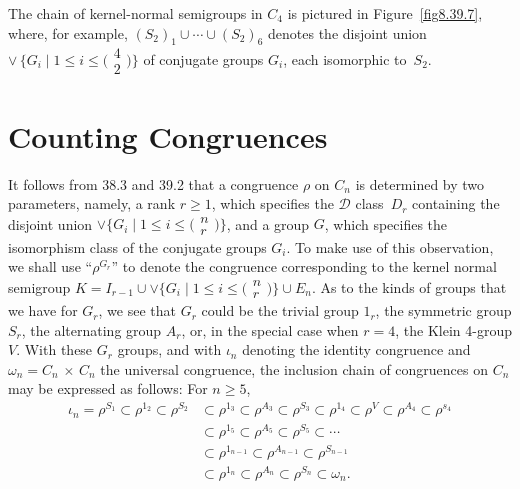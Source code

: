 \documentclass{surv-l}
\numberwithin{equation}{section}
\numberwithin{table}{section}
\numberwithin{figure}{section}
\theoremstyle{definition}
\begin{document}
The chain of kernel-normal semigroups in $C_{4}$ is pictured in
Figure~\ref{fig8.39.7}, where, for example,
$(S_{2})_{1}\cup\cdots\cup(S_{2})_{6}$ denotes the disjoint union
$\vee\,\{G_{i}\mid 1\leq i\leq\big(\!\begin{smallmatrix}
4\\
2 \end{smallmatrix}\!\big)\}$ of conjugate groups $G_{i}$, each
isomorphic to~$S_{2}$.

\section{Counting Congruences}\label{sec8.40}

It follows from 38.3 and 39.2 that a congruence $\rho$ on $C_{n}$
is determined by two parameters, namely, a rank $r\geq 1$, which
specifies the $\mathcal{D}$ class~$D_{r}$ containing the disjoint
union $\vee \{G_{i}\mid 1 \leq i\leq\big(\!\begin{smallmatrix}
n\\
r \end{smallmatrix}\!\big)\}$, and a group $G$, which specifies
the isomorphism class of the conjugate groups $G_{i}$. To make use
of this observation, we shall use ``$\rho^{G_{r}}$'' to denote the
congruence corresponding to the kernel normal semigroup $K=I_{r-1}
\cup \vee \{G_{i}\mid 1\leq i\leq\big(\!\begin{smallmatrix}
n\\
r \end{smallmatrix}\!\big)\}\cup E_{n}$. As to the kinds of groups
that we have for $G_{r}$, we see that $G_{r}$ could be the trivial
group $1_{r}$, the symmetric group $S_{r}$, the alternating group
$A_{r}$, or, in the special case when $r=4$, the Klein 4-group
$V$. With these $G_{r}$ groups, and with $\iota_{n}$ denoting the
identity congruence and $\omega_{n}=C_{n}\,\times\, C_{n}$ the
universal congruence, the inclusion chain of congruences on
$C_{n}$ may be expressed as follows: For $n \geq 5$,
\begin{align*}
\iota_{n}=\rho^{S_{1}}\subset\rho^{1_{2}}\subset\rho^{S_{2}}&\subset\rho^{1_{3}}\subset\rho^{A_{3}}\subset\rho^{S_{3}}\subset\rho^{1_{4}}\subset\rho^{V}\subset\rho^{A_{4}}\subset\rho^{s_{4}} \\
&\subset\rho^{1_{5}}\subset\rho^{A_{5}}\subset\rho^{S_{5}}\subset\cdots \\
&\subset\rho^{1_{n-1}}\subset\rho^{A_{n-1}}\subset\rho^{S_{n-1}} \\
&\subset\rho^{1_{n}}\subset\rho^{A_{n}}\subset\rho^{S_{n}}\subset\omega_{n}.
\end{align*}
\end{document}
